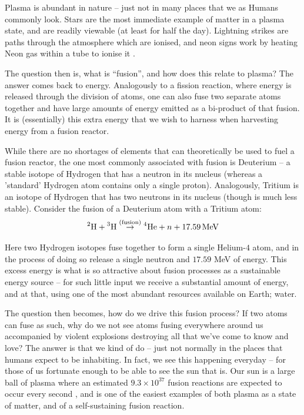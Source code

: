 Plasma is abundant in nature -- just not in many places that we as Humans commonly look. Stars are the most immediate example of matter in a plasma state, 
and are readily viewable (at least for half the day). Lightning strikes are paths through the atmosphere which are ionised, 
and neon signs work by heating Neon gas within a tube to ionise it \cite{plasma-lightning}.

The question then is, what is ``fusion'', and how does this relate to plasma? The answer comes back to energy. Analogously to a fission reaction, 
where energy is released through the division of atoms, one can also fuse two separate atoms together and have large amounts of energy emitted 
as a bi-product of that fusion. It is (essentially) this extra energy that we wish to harness when harvesting energy from a fusion reactor.

While there are no shortages of elements that can theoretically be used to fuel a fusion reactor, the one most commonly associated with fusion is Deuterium -- a stable isotope of Hydrogen that 
has a neutron in its nucleus (whereas a 'standard' Hydrogen atom contains only a single proton). Analogously, Tritium is an isotope of Hydrogen
that has two neutrons in its nucleus (though is much less stable). Consider the fusion of a Deuterium atom with a Tritium atom:
\[ \prescript{2}{}{\text{H}} + \prescript{3}{}{\text{H}} \stackrel{\text{(fusion)}}{\to} \prescript{4}{}{\text{He}} + n + 17.59 \, \text{MeV} \]

Here two Hydrogen isotopes fuse together to form a single Helium-$4$ atom, and in the process of doing so release 
a single neutron and $17.59$ MeV of energy. This excess energy is what is so attractive about fusion processes as a sustainable 
energy source -- for such little input we receive a substantial amount of energy, and at that, using one of the most abundant 
resources available on Earth; water.

The question then becomes, how do we drive this fusion process? If two atoms can fuse as such, why do we not 
see atoms fusing everywhere around us accompanied by violent explosions destroying all that we've 
come to know and love? The answer is that we kind of do -- just not normally in the places that humans expect to be inhabiting. In fact, we see this happening everyday --
for those of us fortunate enough to be able to see the sun that is. Our sun 
is a large ball of plasma where an estimated $9.3 \times 10^{37}$ fusion reactions are expected to occur every second \cite{nasa-sun-fusion}, 
and is one of the easiest examples of both plasma as a state of matter, and of a self-sustaining fusion reaction.

